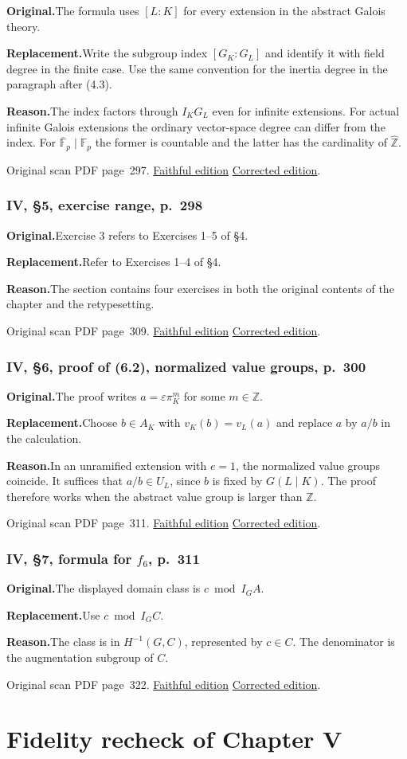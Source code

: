 \documentclass[11pt,a4paper]{article}
\newcommand{\original}{\par\smallskip\noindent\textbf{Original.}\enspace}
\newcommand{\replacement}{\par\smallskip\noindent\textbf{Replacement.}\enspace}
\newcommand{\reason}{\par\smallskip\noindent\textbf{Reason.}\enspace}
\newcommand{\editionlink}[3]{\href{#1\#errata.#2}{#3}}
\newcommand{\location}[2]{%
  \par\smallskip\noindent Original scan PDF page~#2.\enspace
  \editionlink{Neukirch_Faithful.pdf}{#1}{Faithful edition}
  \quad\editionlink{Neukirch_Corrected.pdf}{#1}{Corrected edition}.}
\begin{document}
\original The formula uses $[L:K]$ for every extension in the abstract Galois theory.
\replacement Write the subgroup index $[G_K:G_L]$ and identify it with field degree in the finite case. Use the same convention for the inertia degree in the paragraph after (4.3).
\reason The index factors through $I_KG_L$ even for infinite extensions. For actual infinite Galois extensions the ordinary vector-space degree can differ from the index. For $\overline{\mathbb F}_p\mid\mathbb F_p$ the former is countable and the latter has the cardinality of $\widehat{\mathbb Z}$.
\location{195}{297}

\setcounter{section}{198}
\section{IV, \S5, exercise range, p.~298}\label{errata:item:199}

\original Exercise 3 refers to Exercises 1--5 of \S4.
\replacement Refer to Exercises 1--4 of \S4.
\reason The section contains four exercises in both the original contents of the chapter and the retypesetting.
\location{199}{309}

\setcounter{section}{199}
\section{IV, \S6, proof of (6.2), normalized value groups, p.~300}\label{errata:item:200}

\original The proof writes $a=\varepsilon\pi_K^m$ for some $m\in\mathbb Z$.
\replacement Choose $b\in A_K$ with $v_K(b)=v_L(a)$ and replace $a$ by $a/b$ in the calculation.
\reason In an unramified extension with $e=1$, the normalized value groups coincide. It suffices that $a/b\in U_L$, since $b$ is fixed by $G(L\mid K)$. The proof therefore works when the abstract value group is larger than $\mathbb Z$.
\location{200}{311}

\setcounter{section}{200}
\section{IV, \S7, formula for $f_6$, p.~311}\label{errata:item:201}

\original The displayed domain class is $c\bmod I_G A$.
\replacement Use $c\bmod I_G C$.
\reason The class is in $H^{-1}(G,C)$, represented by $c\in C$. The denominator is the augmentation subgroup of $C$.
\location{201}{322}

\part{Fidelity recheck of Chapter V}
\setcounter{section}{195}
\end{document}
